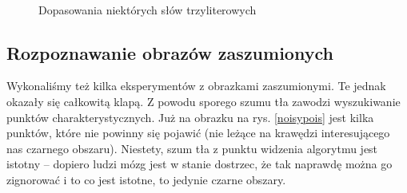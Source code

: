 \documentclass[a4paper,12pt,leqno]{article}
\begin{document}
\begin{figure}\centering
{}\\
\hspace{5mm}
\caption{Dopasowania niektórych słów trzyliterowych}
\end{figure}

\subsection{Rozpoznawanie obrazów zaszumionych}

Wykonaliśmy też kilka eksperymentów z obrazkami zaszumionymi. Te jednak okazały się całkowitą klapą. Z powodu sporego szumu tła zawodzi wyszukiwanie
punktów charakterystycznych. Już na obrazku na rys. \ref{noisypois} jest kilka punktów, które nie powinny się pojawić (nie leżące na krawędzi
interesującego nas czarnego obszaru). Niestety, szum tła z punktu widzenia algorytmu jest istotny -- dopiero ludzi mózg jest w stanie dostrzec,
że tak naprawdę można go zignorować i to co jest istotne, to jedynie czarne obszary.
\end{document}
